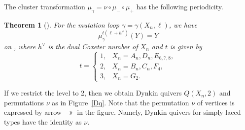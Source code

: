 \documentclass[pdftex]{sigma}
\numberwithin{equation}{section}
\newtheorem{Theorem}{Theorem}[section]
\begin{document}
The cluster transformation $\mu_\gamma=\nu\circ\mu_-\circ\mu_+$ has the following periodicity.
		\begin{Theorem}[{\cite{IIKKN, IIKKN2, K}}]%
		For the mutation loop $\gamma=\gamma(X_n,\ell)$, we have
			\[\mu_\gamma^{t(\ell+h^\vee)}(Y)=Y\]
		on , where $h^\vee$ is the dual Coxeter number of $X_n$ and $t$ is given by
			\[t=\begin{cases}
				1,&X_n=A_n,D_n,E_{6,7,8},\\
				2,&X_n=B_n,C_n,F_4,\\
				3,&X_n=G_2.
			\end{cases}\]
		\end{Theorem}

If we restrict the level to 2, then we obtain Dynkin quivers $Q(X_n,2)$ and permutations $\nu$ as in Figure~\ref{Dq}.
Note that the permutation $\nu$ of vertices is expressed by arrow $\twoheadrightarrow$ in the figure.
Namely, Dynkin quivers for simply-laced types have the identity as $\nu$.
\end{document}
